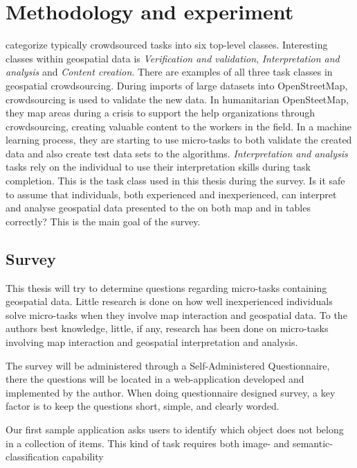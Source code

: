 \chapter{Methodology and experiment}

\cite{Gadiraju2015} categorize typically crowdsourced tasks into six top-level classes. Interesting classes within geospatial data is \textit{Verification and validation}, \textit{Interpretation and analysis} and \textit{Content creation}. There are examples of all three task classes in geospatial crowdsourcing. During imports of large datasets into OpenStreetMap, crowdsourcing is used to validate the new data. In humanitarian OpenSteetMap, they map areas during a crisis to support the help organizations through crowdsourcing, creating valuable content to the workers in the field. In a machine learning process, they are starting to use micro-tasks to both validate the created data and also create test data sets to the algorithms. \textit{Interpretation and analysis} tasks rely on the individual to use their interpretation skills during task completion. This is the task class used in this thesis during the survey. Is it safe to assume that individuals, both experienced and inexperienced, can interpret and analyse geospatial data presented to the on both map and in tables correctly? This is the main goal of the survey. 

\section{Survey}
This thesis will try to determine questions regarding micro-tasks containing geospatial data. Little research is done on how well inexperienced individuals solve micro-tasks when they involve map interaction and geospatial data. To the authors best knowledge, little, if any, research has been done on micro-tasks involving map interaction and geospatial interpretation and analysis. 

The survey will be administered through a Self-Administered Questionnaire, there the questions will be located in a web-application developed and implemented by the author. When doing questionnaire designed survey, a key factor is to keep the questions short, simple, and clearly worded. 

Our first sample application asks users to identify which object does not belong in a collection of items. This kind of task requires both image- and semantic-classification capability %

